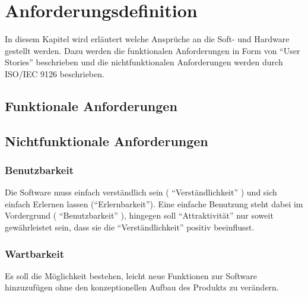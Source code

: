\chapter{Anforderungsdefinition} %
\label{sec:Anforderungen}
\vspace{-3cm}
\begin{flushleft}
In diesem Kapitel wird erläutert welche Ansprüche an die Soft- und Hardware gestellt werden.
Dazu werden die funktionalen Anforderungen in Form von ``User Stories'' beschrieben und die nichtfunktionalen Anforderungen werden durch ISO/IEC 9126 beschrieben.


\section{Funktionale Anforderungen} %
\label{sec:Funktionale Anforderungen}




\section{Nichtfunktionale Anforderungen} %
\label{sec:Nichtfunktionale Anforderungen}

\subsection{Benutzbarkeit} %
\label{sub:Benutzbarkeit}

Die Software muss einfach verständlich sein ( ``Verständlichkeit'' ) und sich einfach Erlernen lassen (``Erlernbarkeit'').
Eine einfache Benutzung steht dabei im Vordergrund ( ``Benutzbarkeit'' ), hingegen soll ``Attraktivität'' nur soweit gewährleistet sein,
dass sie die ``Verständlichkeit'' positiv beeinflusst. 



\subsection{Wartbarkeit} %
\label{sub:Wartbarkeit}

Es soll die Möglichkeit bestehen, leicht neue Funktionen zur Software hinzuzufügen ohne den konzeptionellen Aufbau des Produkts zu verändern. 


\end{flushleft}
